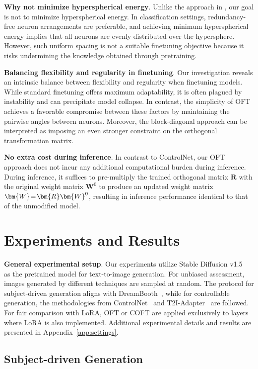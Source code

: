 \textbf{Why not minimize hyperspherical energy}. Unlike the approach in \cite{liu2021orthogonal}, our goal is not to minimize hyperspherical energy. In classification settings, redundancy-free neuron arrangements are preferable, and achieving minimum hyperspherical energy implies that all neurons are evenly distributed over the hypersphere. However, such uniform spacing is not a suitable finetuning objective because it risks undermining the knowledge obtained through pretraining.

\textbf{Balancing flexibility and regularity in finetuning}. Our investigation reveals an intrinsic balance between flexibility and regularity when finetuning models. While standard finetuning offers maximum adaptability, it is often plagued by instability and can precipitate model collapse. In contrast, the simplicity of OFT achieves a favorable compromise between these factors by maintaining the pairwise angles between neurons. Moreover, the block-diagonal approach can be interpreted as imposing an even stronger constraint on the orthogonal transformation matrix.

\textbf{No extra cost during inference}. In contrast to ControlNet, our OFT approach does not incur any additional computational burden during inference. During inference, it suffices to pre-multiply the trained orthogonal matrix $\bm{R}$ with the original weight matrix $\bm{W}^0$ to produce an updated weight matrix $\thickmuskip=2mu \medmuskip=2mu \bm{W}=\bm{R}\bm{W}^0$, resulting in inference performance identical to that of the unmodified model.

\section{Experiments and Results}

\textbf{General experimental setup}. Our experiments utilize Stable Diffusion v1.5~\cite{rombach2022high} as the pretrained model for text-to-image generation. For unbiased assessment, images generated by different techniques are sampled at random. The protocol for subject-driven generation aligns with DreamBooth~\cite{ruiz2023dreambooth}, while for controllable generation, the methodologies from ControlNet~\cite{zhang2023adding} and T2I-Adapter~\cite{mou2023t2i} are followed. For fair comparison with LoRA, OFT or COFT are applied exclusively to layers where LoRA is also implemented. Additional experimental details and results are presented in Appendix~\ref{app:settings}.

\subsection{Subject-driven Generation}

